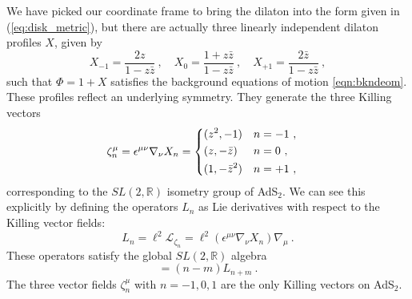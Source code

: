 \documentclass[12pt]{article}
\newcommand{\bz}{\bar{z}}
\begin{document}
We have picked our coordinate frame to bring the dilaton into the form given in (\ref{eq:disk_metric}), but there are actually three linearly independent dilaton profiles $X$, given by
\begin{equation}
	X_{-1} = \frac{2z}{1- z \bz}~, \quad X_{0} = \frac{1 + z \bz}{1- z \bz}~, \quad X_{+1} = \frac{2\bz}{1- z \bz}~,
\label{eq:xprofiles}
\end{equation}
such that $\Phi = 1 + X$ satisfies the background equations of motion \eqref{eqn:bkndeom}. These profiles reflect an underlying symmetry. They generate the three Killing vectors
\begin{equation}\begin{aligned}
	\zeta_n^\mu &= \epsilon^{\mu\nu} \nabla_\nu X_n = 
	\begin{dcases} 
		(z^2,-1) & n = -1~, \\
		(z,-\bar{z}) & n = 0~,\\
		(1,-{\bar z}^2) & n = +1~, 
	\end{dcases}
\label{eq:zetavectors}
\end{aligned}\end{equation}
corresponding to the $SL(2,\mathbb{R})$ isometry group of AdS$_2$. We can see this explicitly by defining the operators $L_n$ as Lie derivatives with respect to the Killing vector fields:
\begin{equation}
	L_n = \ell^2\mathcal{L}_{\zeta_n} = \ell^2(\epsilon^{\mu\nu}\nabla_\nu X_n)\nabla_\mu~.
\end{equation}
These operators satisfy the global $SL(2,\mathbb{R})$ algebra
\begin{equation}
	[L_n, L_m] = (n-m) L_{n+m}~.
	\label{eqn:Killingalg}
\end{equation}
The three vector fields $\zeta_n^\mu$ with $n=-1, 0, 1$ are the only Killing vectors on AdS$_2$. 
\end{document}
